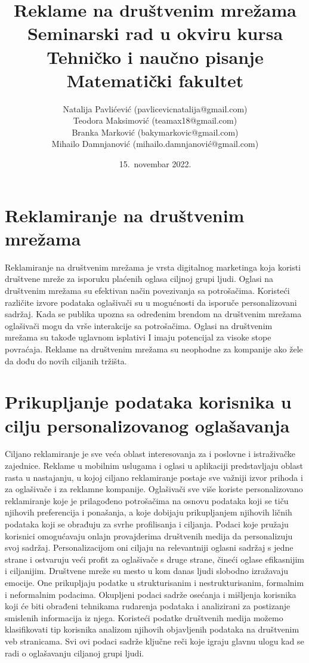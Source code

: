 \documentclass[a4paper]{article}
\title{Reklame na društvenim mrežama\\ \small{Seminarski rad u okviru kursa\\Tehničko i naučno pisanje\\ Matematički fakultet}}
\author{Natalija Pavlićević (pavlicevicnatalija@gmail.com)\\ Teodora Maksimović (teamax18@gmail.com)\\ Branka Marković (bakymarkovic@gmail.com)\\ Mihailo Damnjanović (mihailo.damnjanović@gmail.com)}
\date{15.~novembar 2022.}
\begin{document}
	
	
	\tableofcontents
	
	\newpage
	
	\section{Reklamiranje na društvenim mrežama}
	
	Reklamiranje na društvenim mrežama je vrsta digitalnog marketinga koja koristi društvene mreže za isporuku plaćenih oglasa ciljnoj grupi ljudi. Oglasi na društvenim mrežama su efektivan način povezivanja sa potrošačima. Koristeći različite izvore podataka oglašivači su u mogućnosti da isporuče personalizovani sadržaj. Kada se publika upozna sa određenim brendom na društvenim mrežama oglašivači mogu da vrše interakcije sa potrošačima. Oglasi na društvenim mrežama su takođe uglavnom isplativi I imaju potencijal za visoke stope povraćaja. Reklame na društvenim mrežama su neophodne za kompanije ako žele da dođu do novih ciljanih tržišta. 
	
	\section{Prikupljanje podataka korisnika u cilju personalizovanog oglašavanja}
	\label{sec:podaci}
	Ciljano reklamiranje je sve veća oblast interesovanja za i poslovne i istraživačke zajednice. Reklame u mobilnim uslugama i oglasi u aplikaciji predstavljaju oblast rasta u nastajanju, u kojoj ciljano reklamiranje postaje sve važniji izvor prihoda i za oglašivače i za reklamne kompanije. Oglašivači sve više koriste personalizovano reklamiranje koje je prilagođeno potrošačima na osnovu podataka koji se tiču njihovih preferencija i ponašanja, a koje dobijaju prikupljanjem njihovih ličnih podataka koji se obrađuju za svrhe profilisanja i ciljanja. Podaci koje pružaju korisnici omogućavaju onlajn provajderima društvenih medija da personalizuju svoj sadržaj. Personalizacijom oni ciljaju na relevantniji oglasni sadržaj s jedne strane i ostvaruju veći profit za oglašivače s druge strane, čineći oglase efikasnijim i ciljanijim.
	Društvene mreže su mesto u kom danas ljudi slobodno izražavaju emocije. One prikupljaju podatke u strukturisanim i nestrukturisanim, formalnim i neformalnim podacima. Okupljeni podaci sadrže osećanja i mišljenja korisnika koji će biti obrađeni tehnikama rudarenja podataka i analizirani za postizanje smislenih informacija iz njega. Koristeći podatke društvenih medija možemo klasifikovati tip korisnika analizom njihovih objavljenih podataka na društvenim veb stranicama. Svi ovi podaci sadrže ključne reči koje igraju glavnu ulogu kad se radi o oglašavanju ciljanoj grupi ljudi.
	
\end{document}

